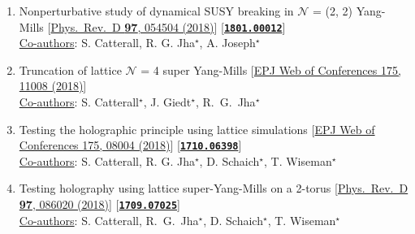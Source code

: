 \documentclass[article]{res}
\begin{document}
\begin{enumerate}
 \item Nonperturbative study of dynamical SUSY breaking in $\mathcal{N}$ = (2, 2) Yang-Mills [\href{https://journals.aps.org/prd/abstract/10.1103/PhysRevD.97.054504}{Phys.\ Rev.\ D {\bf 97}, 054504 (2018)}] [\texttt{\textbf{\textcolor{blue}{\href{https://arxiv.org/abs/1801.00012}{1801.00012}}}}]  \\
 \underline{Co-authors}: S. Catterall, R. G. Jha$^{\star}$, A. Joseph$^{\star}$
 \vspace{2mm} 
 
 \item Truncation of lattice $\mathcal{N}$ = 4 super Yang-Mills [\href{https://doi.org/10.1051/epjconf/201817511008}{EPJ Web of Conferences 175, 11008 (2018)}] \\
  \underline{Co-authors}: S. Catterall$^{\star}$, J. Giedt$^{\star}$, R.~G.~Jha$^{\star}$
  \vspace{3mm} 
  
\item Testing the holographic principle using lattice simulations  [\href{https://doi.org/10.1051/epjconf/201817508004}{EPJ Web of Conferences 175, 08004 (2018)}] [\texttt{\textbf{\textcolor{blue}{\href{https://arxiv.org/abs/1710.06398}{1710.06398}}}}] \\
\underline{Co-authors}: S. Catterall, R. G. Jha$^{\star}$, D. Schaich$^{\star}$, T. Wiseman$^{\star}$
 \vspace{2mm} 

\item Testing holography using lattice super-Yang-Mills on a 2-torus [\href{https://journals.aps.org/prd/abstract/10.1103/PhysRevD.97.086020}{Phys.\ Rev.\ D {\bf 97}, 086020 (2018)}] [\texttt{\textbf{\textcolor{blue}{\href{https://arxiv.org/abs/1709.07025}{1709.07025}}}}] \\
\underline{Co-authors}: S. Catterall, R.~G.~Jha$^{\star}$, D. Schaich$^{\star}$, T. Wiseman$^{\star}$
 \vspace{2mm} 


\end{enumerate}
 
 
\end{document}
